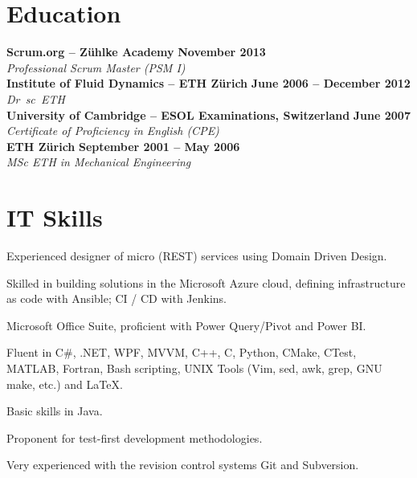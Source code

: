 \documentclass[line,11pt,a4paper]{resume}
\begin{document}
\begin{resume}
\section{\mysidestyle Education}\vspace{2mm}

\textbf{Scrum.org -- Z\"uhlke Academy}
  \hfill \textbf{November 2013}\\
\vspace{1mm}%
\textsl{Professional Scrum Master (PSM I)}\\
\vspace{-1mm}%
%
\textbf{Institute of Fluid Dynamics -- ETH Z\"urich}
  \hfill \textbf{June 2006 -- December 2012}\\
\vspace{1mm}%
\textsl{Dr\ sc\ ETH}\\
\vspace{-1mm}%
%
\textbf{University of Cambridge -- ESOL Examinations, Switzerland}
  \hfill \textbf{June 2007}\\
\vspace{1mm}%
\textsl{Certificate of Proficiency in English (CPE)}\\
\vspace{-1mm}%
%
\textbf{ETH Z\"urich}
  \hfill \textbf{September 2001 -- May 2006}\\
\vspace{1mm}%
\textsl{MSc ETH in Mechanical Engineering}%
\vspace{-3mm}\\\vspace{-1mm}%

\section{\mysidestyle IT Skills}\vspace{6mm}
\begin{list2}
  \item Experienced designer of micro (REST) services using Domain Driven
    Design.
  \item Skilled in building solutions in the Microsoft Azure cloud, defining
    infrastructure as code with Ansible; CI / CD with Jenkins.
  \item Microsoft Office Suite, proficient with Power Query/Pivot and Power BI.
  \item Fluent in C\#, .NET, WPF, MVVM, C++, C, Python, CMake, CTest, MATLAB,
    Fortran, Bash scripting, UNIX Tools (Vim, sed, awk, grep, GNU make, etc.)
    and {\selectfont\LaTeX}.
  \item Basic skills in Java.
  \item Proponent for test-first development methodologies.
  \item Very experienced with the revision control systems Git and Subversion.
\end{list2}


\end{resume}
\end{document}
